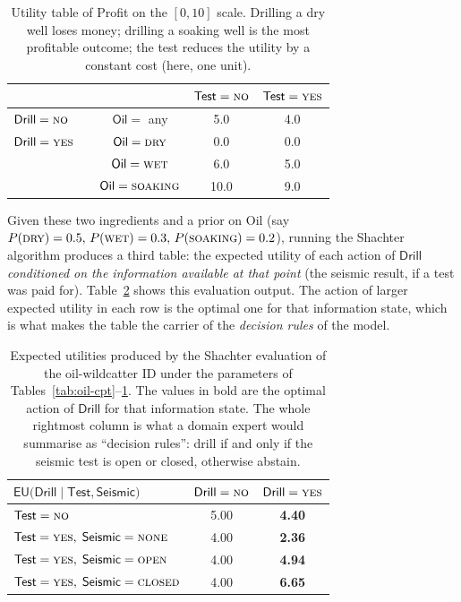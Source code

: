 \begin{table}[H]
\centering\small
\begin{tabular}{lcc|cc}
\hline
& & & $\mathsf{Test}=\textsc{no}$ & $\mathsf{Test}=\textsc{yes}$\\
\hline
$\mathsf{Drill}=\textsc{no}$  & & $\mathsf{Oil}=$ any       & 5.0 & 4.0 \\
\hline
$\mathsf{Drill}=\textsc{yes}$ & & $\mathsf{Oil}=\textsc{dry}$     & 0.0 & 0.0 \\
                              & & $\mathsf{Oil}=\textsc{wet}$     & 6.0 & 5.0 \\
                              & & $\mathsf{Oil}=\textsc{soaking}$ & 10.0& 9.0 \\
\hline
\end{tabular}
\caption{Utility table of \textsf{Profit} on the $[0,10]$ scale.
Drilling a dry well loses money; drilling a soaking well is the most
profitable outcome; the test reduces the utility by a constant cost
(here, one unit).}
\label{tab:oil-util}
\end{table}

Given these two ingredients and a prior on \textsf{Oil}
(say $P(\textsc{dry}) = 0.5,\, P(\textsc{wet}) = 0.3,\,
P(\textsc{soaking}) = 0.2$), running the Shachter algorithm produces
a third table: the expected utility of each action of $\mathsf{Drill}$
\emph{conditioned on the information available at that point} (the
seismic result, if a test was paid for). Table~\ref{tab:oil-eu} shows
this evaluation output. The action of larger expected utility in each
row is the optimal one for that information state, which is what
makes the table the carrier of the \emph{decision rules} of the model.

\begin{table}[H]
\centering\small
\begin{tabular}{l|cc}
\hline
$\mathsf{EU}\bigl(\mathsf{Drill}\mid \mathsf{Test}, \mathsf{Seismic}\bigr)$
                                 & $\mathsf{Drill}=\textsc{no}$ & $\mathsf{Drill}=\textsc{yes}$\\
\hline
$\mathsf{Test}=\textsc{no}$      & 5.00 & \textbf{4.40}\\[2pt]
\hline
$\mathsf{Test}=\textsc{yes},\;\mathsf{Seismic}=\textsc{none}$
                                 & 4.00 & \textbf{2.36}\\
$\mathsf{Test}=\textsc{yes},\;\mathsf{Seismic}=\textsc{open}$
                                 & 4.00 & \textbf{4.94}\\
$\mathsf{Test}=\textsc{yes},\;\mathsf{Seismic}=\textsc{closed}$
                                 & 4.00 & \textbf{6.65}\\
\hline
\end{tabular}
\caption{Expected utilities produced by the Shachter evaluation of
the oil-wildcatter ID under the parameters of
Tables~\ref{tab:oil-cpt}--\ref{tab:oil-util}.
The values in bold are the optimal action of $\mathsf{Drill}$ for
that information state. The whole rightmost column is what a domain
expert would summarise as ``decision rules'': drill if and only if
the seismic test is open or closed, otherwise abstain.}
\label{tab:oil-eu}
\end{table}

